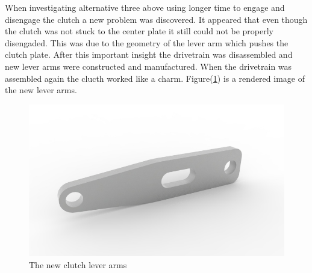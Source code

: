When investigating alternative three above using longer time to engage and disengage the clutch a new problem was discovered. It appeared that even though the clutch was not stuck to the center plate it still could not be properly disengaded. This was due to the geometry of the lever arm which pushes the clutch plate.  After this important insight the drivetrain was disassembled and new lever arms were constructed and manufactured. When the drivetrain was assembled again the clucth worked like a charm. Figure(\ref{fig:clutch}) is a rendered image of the new lever arms.

\begin{figure}[H]
    \centering
    \label{fig:clutch}
    \includegraphics[width=1\textwidth]{./img/clutch}
    \caption{The new clutch lever arms}
\end{figure}


